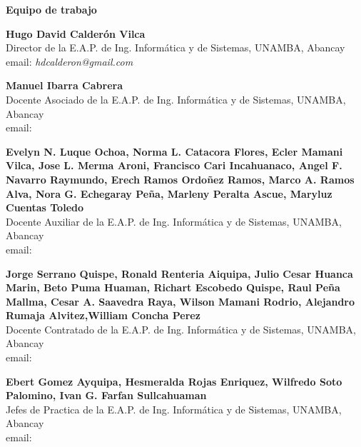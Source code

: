 \begin{center}
{\bf \Huge Equipo de trabajo}
\end{center}
\vspace{1cm}

\begin{center}
\textbf{Hugo David Calderón Vilca}\\
Director de la E.A.P. de Ing. Informática y de Sistemas, UNAMBA, Abancay\\
email: \textit{hdcalderon@gmail.com}\\
\end{center}

\begin{center}
\textbf{Manuel Ibarra Cabrera}\\
Docente Asociado de la E.A.P. de Ing. Informática y de Sistemas, UNAMBA, Abancay\\
email: \textit{ }\\
\end{center}

\begin{center}
\textbf{ Evelyn N. Luque Ochoa, Norma L. Catacora Flores, Ecler Mamani Vilca, Jose L. Merma Aroni, Francisco Cari Incahuanaco, Angel F. Navarro Raymundo, Erech Ramos Ordoñez Ramos, Marco A. Ramos Alva, Nora G. Echegaray Peña, Marleny Peralta Ascue, Maryluz Cuentas Toledo}\\
Docente Auxiliar de la E.A.P. de Ing. Informática y de Sistemas, UNAMBA, Abancay\\
email: \textit{ }\\
\end{center}

\begin{center}
\textbf{Jorge Serrano Quispe, Ronald Renteria Aiquipa, Julio Cesar Huanca Marin, Beto Puma Huaman, Richart Escobedo Quispe, Raul Peña Mallma, Cesar A. Saavedra Raya, Wilson Mamani Rodrio, Alejandro Rumaja Alvitez,William Concha Perez}\\
Docente Contratado de la E.A.P. de Ing. Informática y de Sistemas, UNAMBA, Abancay\\
email: \textit{ }\\
\end{center}


\begin{center}
\textbf{Ebert Gomez Ayquipa, Hesmeralda Rojas Enriquez, Wilfredo Soto Palomino, Ivan G. Farfan Sullcahuaman }\\
Jefes de Practica de la E.A.P. de Ing. Informática y de Sistemas, UNAMBA, Abancay\\
email: \textit{ }\\
\end{center}


